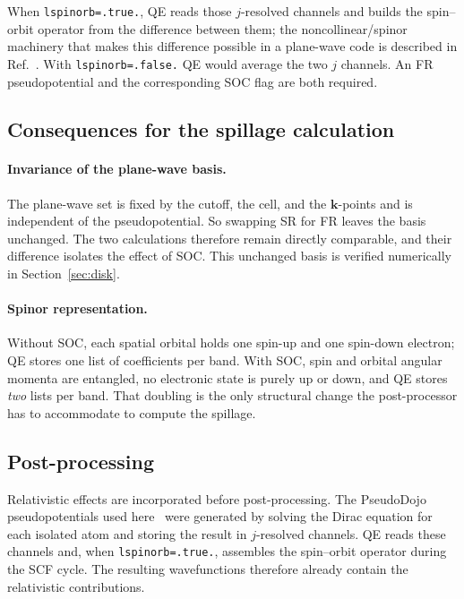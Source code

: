 \documentclass[11pt]{article}
\newcommand{\kk}{\mathbf{k}}
\begin{document}
When \texttt{lspinorb=.true.}, QE reads those $j$-resolved channels and builds the spin--orbit
operator from the difference between them; the noncollinear/spinor machinery that makes this difference possible
in a plane-wave code is described in Ref.~\cite{dalcorso2005}. With \texttt{lspinorb=.false.} QE
would average the two $j$ channels. An FR pseudopotential and the corresponding SOC flag are both
required.

\subsection{Consequences for the spillage calculation}

\paragraph{Invariance of the plane-wave basis.} The plane-wave set is fixed by the cutoff, the cell, and the
$\kk$-points and is independent of the pseudopotential. So swapping SR for FR leaves the basis
unchanged. The two calculations therefore remain directly comparable, and their difference isolates
the effect of SOC. This unchanged basis is verified numerically in Section~\ref{sec:disk}.

\paragraph{Spinor representation.} Without SOC, each spatial orbital holds one spin-up and one
spin-down electron; QE stores one list of coefficients per band. With SOC, spin and orbital angular
momenta are entangled, no electronic state is purely up or down, and QE stores \emph{two} lists per
band. That doubling is the only structural change the post-processor has to accommodate to compute
the spillage.

\subsection{Post-processing}\label{sec:pyrel}

Relativistic effects are incorporated before post-processing. The PseudoDojo pseudopotentials
used here~\cite{vansetten2018,hamann2013} were generated by solving the Dirac equation for each
isolated atom and storing the result in $j$-resolved channels. QE reads these channels and, when
\texttt{lspinorb=.true.}, assembles the spin--orbit operator
during the SCF cycle. The resulting wavefunctions therefore already contain the relativistic
contributions.
\end{document}
